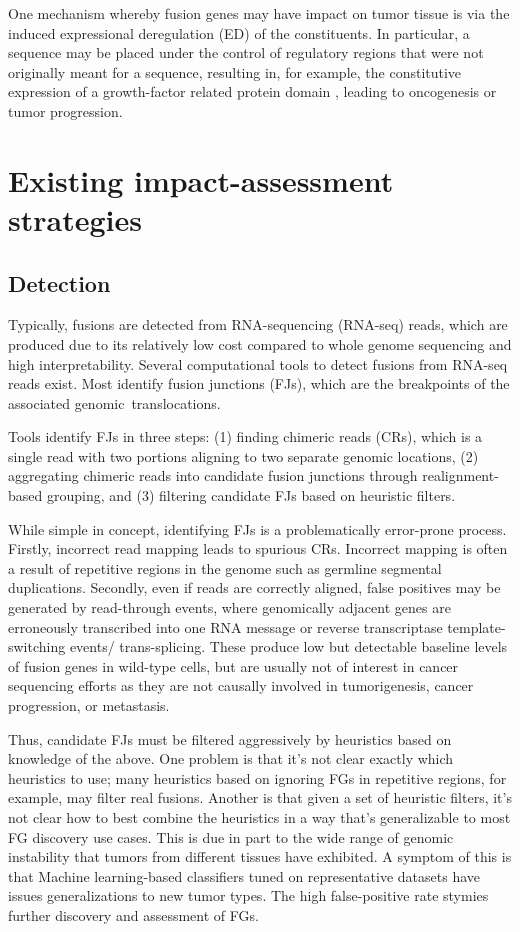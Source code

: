 One mechanism whereby fusion genes may have impact on tumor tissue is
via the induced expressional deregulation (ED) of the constituents. In particular, a sequence may be placed under the control of regulatory regions that were not originally meant for a sequence, resulting in, for example, the constitutive expression of a growth-factor related protein domain \cite{weinberg_biology_2013}, leading to oncogenesis or tumor progression. 


\section{Existing impact-assessment strategies}
\subsection{Detection}
Typically, fusions are detected from RNA-sequencing (RNA-seq) reads,
which are produced due to its relatively low cost compared to whole
genome sequencing and high interpretability. Several computational
tools to detect fusions from RNA-seq reads exist. Most identify fusion
junctions (FJs), which are the breakpoints of the associated
genomic translocations.


Tools identify FJs in three steps: (1) finding chimeric reads (CRs), which is a single read with two portions aligning to two separate genomic locations, (2) aggregating chimeric reads into candidate fusion junctions through realignment-based grouping, and (3) filtering candidate FJs based on heuristic filters. 

While simple in concept, identifying FJs is a problematically error-prone process. Firstly, incorrect read mapping leads to spurious CRs. Incorrect mapping is often a result of repetitive regions in the genome such as germline segmental duplications. Secondly, even if reads are correctly aligned, false positives may be generated by read-through events, where genomically adjacent genes are erroneously transcribed into one RNA message or reverse transcriptase template-switching events/ trans-splicing. These produce low but detectable baseline levels of fusion genes in wild-type cells, but are usually not of interest in cancer sequencing efforts as they are not causally involved in tumorigenesis, cancer progression, or metastasis\cite{gingeras_implications_2009}. 

Thus, candidate FJs must be filtered aggressively by heuristics based on knowledge of the above. One problem is that it’s not clear exactly which heuristics to use; many heuristics based on ignoring FGs in repetitive regions, for example, may filter real fusions\cite{kumar_identifying_2016}. Another is that given a set of heuristic filters, it’s not clear how to best combine the heuristics in a way that’s generalizable to most FG discovery use cases. This is due in part to the wide range of genomic instability that tumors from different tissues have exhibited. A symptom of this is that Machine learning-based classifiers tuned on representative datasets have issues generalizations to new tumor types. The high false-positive rate stymies further discovery and assessment of FGs. 

